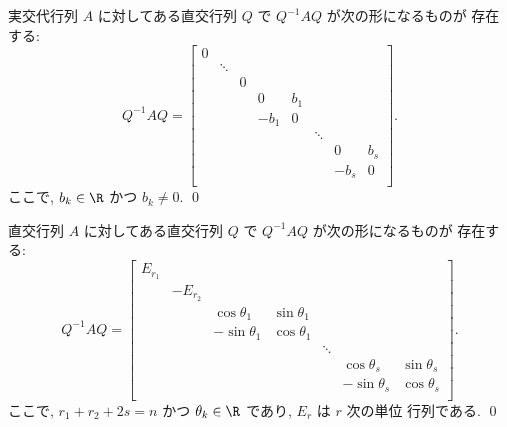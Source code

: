 \documentclass[12pt,twoside]{jarticle}
\begin{document}

\begin{question}[実交代行列の標準形]
\label{q:real-alternating}
  実交代行列 $A$ に対してある直交行列 $Q$ で $Q^{-1}AQ$ が次の形になるものが
  存在する:
  \begin{equation*}
    Q^{-1}AQ =
    \begin{bmatrix}
         0     &        &          &       &     &        &       &     \\
               & \ddots &          &       &     &        &       &     \\
               &        &    0     &       &     &        &       &     \\
               &        &          &    0  & b_1 &        &       &     \\
               &        &          & - b_1 & 0   &        &       &     \\
               &        &          &       &     & \ddots &       &     \\
               &        &          &       &     &        &    0  & b_s \\
               &        &          &       &     &        & - b_s & 0   \\
    \end{bmatrix}.
  \end{equation*}
  ここで, $b_k\in\R$ かつ $b_k\ne 0$. 
  \qed
\end{question}


\begin{question}[直交行列の標準形]
\label{q:orthogonal}
  直交行列 $A$ に対してある直交行列 $Q$ で $Q^{-1}AQ$ が次の形になるものが
  存在する:
  \begin{equation*}
    Q^{-1}AQ =
    \begin{bmatrix}
      E_{r_1} &          &               &              &        & & \\
              & -E_{r_2} &               &              &        & & \\
              &          &  \cos\theta_1 & \sin\theta_1 &        & & \\
              &          & -\sin\theta_1 & \cos\theta_1 &        & & \\
              &          &               &              & \ddots & & \\
              &          &               &              &        &  \cos\theta_s & \sin\theta_s \\
              &          &               &              &        & -\sin\theta_s & \cos\theta_s \\
    \end{bmatrix}.
  \end{equation*}
  ここで, $r_1+r_2+2s=n$ かつ $\theta_k\in\R$ であり, $E_r$ は $r$ 次の単位
  行列である. 
  \qed
\end{question}
\end{document}
